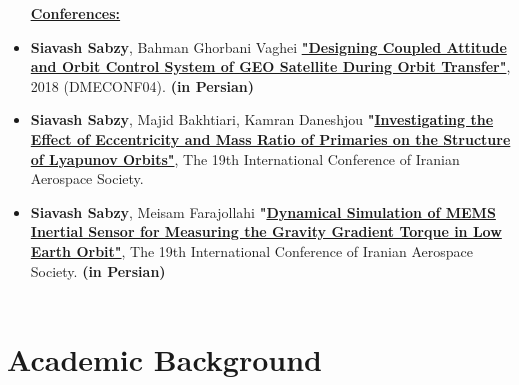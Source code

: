 \documentclass[11pt,a4paper, sans]{moderncv}
\begin{document}
\begin{itemize}
 \textbf{\underline{\href{https://scholar.google.com/citations?user=pz4gpScAAAAJ&hl=en}{Conferences:}}}
	\item \textbf{Siavash Sabzy}, Bahman Ghorbani Vaghei
 \textbf{\href{https://civilica.com/doc/881918/}{"Designing Coupled Attitude and Orbit Control System of GEO Satellite During Orbit Transfer"}}, 2018 (DMECONF04). \textbf{(in Persian)}
 \vspace{5pt}
 \item \textbf{Siavash Sabzy}, Majid Bakhtiari, Kamran Daneshjou
 \textbf{"\href{https://civilica.com/doc/1362193}{Investigating the Effect of Eccentricity and Mass Ratio of Primaries on the Structure of Lyapunov Orbits"}}, The 19th International Conference of Iranian Aerospace Society. 
 \vspace{5pt}
 \item \textbf{Siavash Sabzy}, Meisam Farajollahi
 \textbf{"\href{https://civilica.com/doc/1362348/}{Dynamical Simulation of MEMS Inertial Sensor for Measuring the Gravity Gradient Torque in Low Earth Orbit"}}, The 19th International Conference of Iranian Aerospace Society. \textbf{(in Persian)} 
 \\ \\
\end{itemize}



\section{Academic Background}
%
\end{document}
